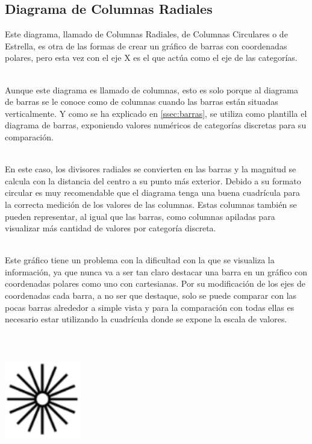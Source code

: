 \documentclass{article}\usepackage[]{graphicx}\usepackage[]{color}
\begin{document}
\subsection{Diagrama de Columnas Radiales} \label{ssec:colRadiales}
Este diagrama, llamado de Columnas Radiales, de Columnas Circulares o de Estrella, es otra de las formas de crear un gr\'afico de barras con coordenadas polares, pero esta vez con el eje X es el que act\'ua como el eje de las categor\'ias.~\\~\par
Aunque este diagrama es llamado de columnas, esto es solo porque al diagrama de barras se le conoce como de columnas cuando las barras est\'an situadas verticalmente. Y como se ha explicado en \ref{ssec:barras}, se utiliza como plantilla el diagrama de barras, exponiendo valores num\'ericos de categor\'ias discretas para su comparaci\'on\cite{historia-barras}.~\\~\par
En este caso, los divisores radiales se convierten en las barras y la magnitud se calcula con la distancia del centro a su punto m\'as exterior. Debido a su formato circular es muy recomendable que el diagrama tenga una buena cuadr\'icula para la correcta medici\'on de los valores de las columnas. Estas columnas tambi\'en se pueden representar, al igual que las barras, como columnas apiladas para visualizar m\'as cantidad de valores por categor\'ia discreta.~\\~\par
Este gr\'afico tiene un problema con la dificultad con la que se visualiza la informaci\'on, ya que nunca va a ser tan claro destacar una barra en un gr\'afico con coordenadas polares como uno con cartesianas. Por su modificaci\'on de los ejes de coordenadas cada barra, a no ser que destaque, solo se puede comparar con las pocas barras alrededor a simple vista y para la comparaci\'on con todas ellas es necesario estar utilizando la cuadr\'icula donde se expone la escala de valores.
~\\~\\~\\~\\
\vbox{
    \centering
    \includegraphics[width=0.25\textwidth]{imag/columnas}
}
\clearpage
\end{document}
